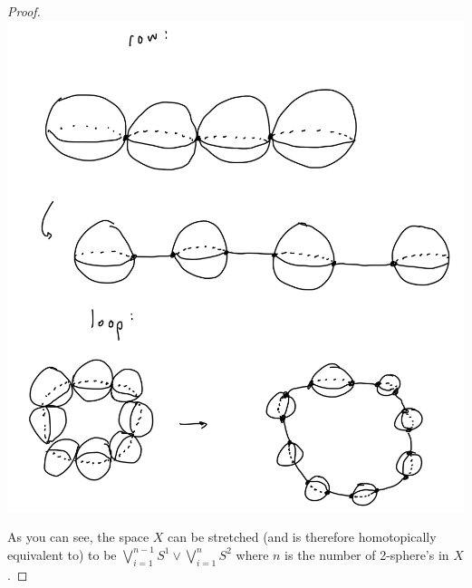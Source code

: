 \documentclass[12pt]{article}
\begin{document}
\begin{proof}
    \par \includegraphics[scale=.2]{3-2.jpg}
    \par As you can see, the space $X$ can be stretched (and is therefore homotopically equivalent to) to be $\bigvee_{i=1}^{n-1} S^1 \vee \bigvee_{i=1}^{n} S^2$ where $n$ is the number of 2-sphere's in $X$. 
\end{proof}
\end{document}

